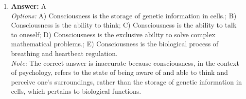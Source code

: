 \documentclass[12pt]{article}
\begin{document}
\begin{enumerate}[label=\arabic*.]
\item \textbf{Answer:} A
\\ \textit{Options:} A) Consciousness is the storage of genetic information in cells.; B) Consciousness is the ability to think; C) Consciousness is the ability to talk to oneself; D) Consciousness is the exclusive ability to solve complex mathematical problems.; E) Consciousness is the biological process of breathing and heartbeat regulation.
\\ \textit{Note:} The correct answer is inaccurate because consciousness, in the context of psychology, refers to the state of being aware of and able to think and perceive one's surroundings, rather than the storage of genetic information in cells, which pertains to biological functions.
\end{enumerate}
\end{document}
